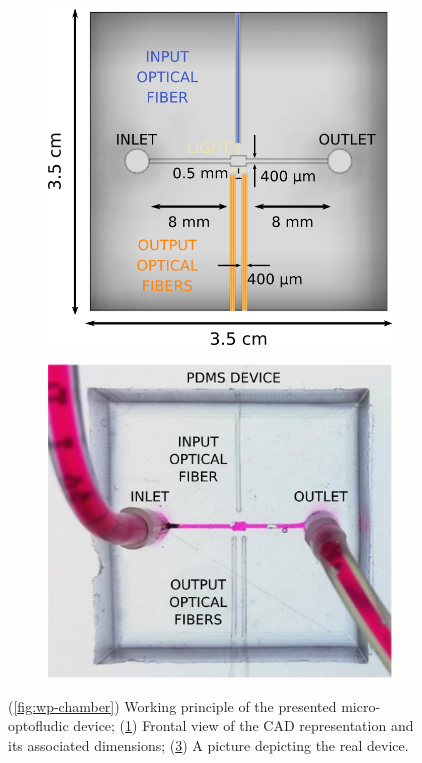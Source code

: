 \documentclass[sn-mathphys]{sn-jnl}
\theoremstyle{thmstyleone}%
\theoremstyle{thmstyletwo}%
\theoremstyle{thmstylethree}%
\begin{document}
\begin{figure}[t]
\begin{subfigure}[b]{0.32\columnwidth}
		\includegraphics[width=\textwidth]{cad-general.png}
		\caption{}
		\label{fig:cad-chamber}
	\end{subfigure}	
	\begin{subfigure}[b]{0.32\columnwidth}			
		\includegraphics[width=\textwidth]{cad-chamber.png}
		\caption{}
		\label{fig:real-device}
	\end{subfigure}
	\caption{(\ref{fig:wp-chamber}) Working principle of the presented micro-optofludic device; (\ref{fig:cad-chamber}) Frontal view of the CAD representation and its associated dimensions; (\ref{fig:real-device}) A picture depicting the real device. }
\end{figure}
\end{document}
